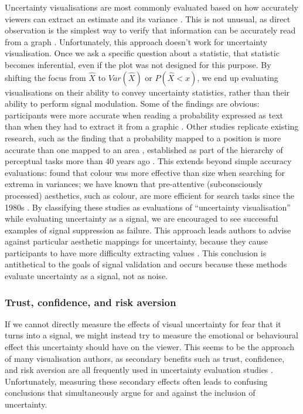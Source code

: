 \documentclass[]{ar-1col-S2O}
\begin{document}
Uncertainty visualisations are most commonly evaluated based on how
accurately viewers can extract an estimate and its variance
\citep{Kinkeldey2014, Hullman2019}. This is not unusual, as direct
observation is the simplest way to verify that information can be
accurately read from a graph \citep{Vanderplas2020}. Unfortunately, this
approach doesn't work for uncertainty visualisation. Once we ask a
specific question about a statistic, that statistic becomes inferential,
even if the plot was not designed for this purpose. By shifting the
focus from \(\hat{X}\) to \(Var(\hat{X})\) or \(P(\hat{X}<x)\), we end
up evaluating visualisations on their ability to convey uncertainty
statistics, rather than their ability to perform signal modulation. Some
of the findings are obvious: participants were more accurate when
reading a probability expressed as text than when they had to extract it
from a graphic \citep{Cheong2016, Savelli2013}. Other studies replicate
existing research, such as the finding that a probability mapped to a
position is more accurate than one mapped to an area
\citep{Ibrekk1987, Gschwandtnei2016}, established as part of the
hierarchy of perceptual tasks more than 40 years ago
\citetext{\citealp{Cleveland1984}; \citealp[replicated by][]{heer2010}}.
This extends beyond simple accuracy evaluations: \citet{Sanyal2009}
found that colour was more effective than size when searching for
extrema in variances; we have known that pre-attentive (subconsciously
processed) aesthetics, such as colour, are more efficient for search
tasks since the 1980s \citep{Vanderplas2020}. By classifying these
studies as evaluations of ``uncertainty visualisation'' while evaluating
uncertainty as a signal, we are encouraged to see successful examples of
signal suppression as failure. This approach leads authors to advise
against particular aesthetic mappings for uncertainty, because they
cause participants to have more difficulty extracting values
\citep{Blenkinsop2000}. This conclusion is antithetical to the goals of
signal validation and occurs because these methods evaluate uncertainty
as a signal, not as noise.

\subsubsection{Trust, confidence, and risk
aversion}\label{trust-confidence-and-risk-aversion}

If we cannot directly measure the effects of visual uncertainty for fear
that it turns into a signal, we might instead try to measure the
emotional or behavioural effect this uncertainty should have on the
viewer. This seems to be the approach of many visualisation authors, as
secondary benefits such as trust, confidence, and risk aversion are all
frequently used in uncertainty evaluation studies \citep{Hullman2019}.
Unfortunately, measuring these secondary effects often leads to
confusing conclusions that simultaneously argue for and against the
inclusion of uncertainty.
\end{document}
